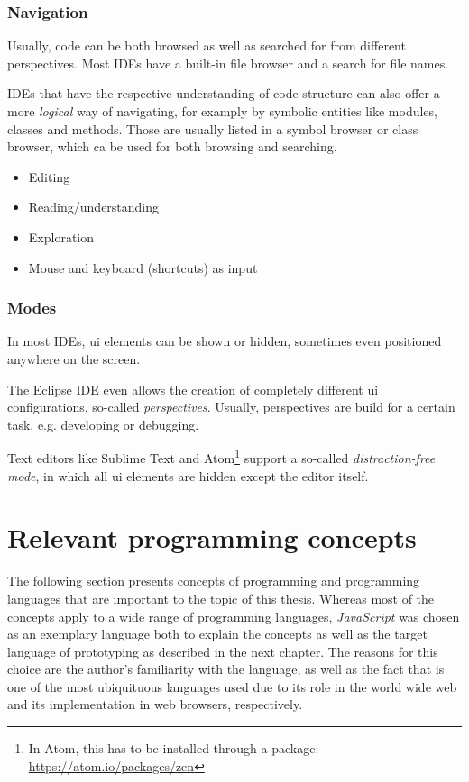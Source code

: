 \subsubsection{Navigation}\label{navigation}

Usually, code can be both browsed as well as searched for from different
perspectives. Most IDEs have a built-in file browser and a search for
file names.

IDEs that have the respective understanding of code structure can also
offer a more \emph{logical} way of navigating, for examply by symbolic
entities like modules, classes and methods. Those are usually listed in
a symbol browser or class browser, which ca be used for both browsing
and searching.

\begin{itemize}
\itemsep1pt\parskip0pt
\item
  Editing
\item
  Reading/understanding
\item
  Exploration
\item
  Mouse and keyboard (shortcuts) as input
\end{itemize}

\subsubsection{Modes}\label{modes}

In most IDEs, \ac{ui} elements can be shown or hidden, sometimes even
positioned anywhere on the screen.

The Eclipse IDE even allows the creation of completely different \ac{ui}
configurations, so-called \emph{perspectives}. Usually, perspectives are
build for a certain task, e.g. developing or debugging.

Text editors like Sublime Text and
Atom\footnote{In Atom, this has to be installed through a package: \url{https://atom.io/packages/zen}}
support a so-called \emph{distraction-free mode}, in which all \acl{ui}
elements are hidden except the editor itself.

\section{Relevant programming
concepts}\label{relevant-programming-concepts}

The following section presents concepts of programming and programming
languages that are important to the topic of this thesis. Whereas most
of the concepts apply to a wide range of programming languages,
\emph{JavaScript} was chosen as an exemplary language both to explain
the concepts as well as the target language of prototyping as described
in the next chapter. The reasons for this choice are the author’s
familiarity with the language, as well as the fact that is one of the
most ubiquituous languages used due to its role in the world wide web
and its implementation in web browsers, respectively.

